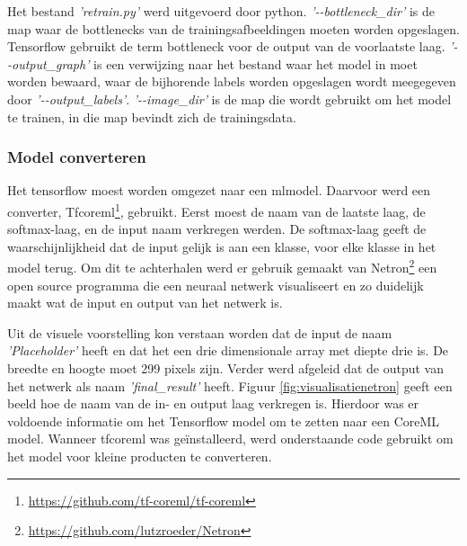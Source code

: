 
Het bestand \textit{'retrain.py'} werd uitgevoerd door python. \textit{'-\phantom{}-bottleneck\_dir'} is de map waar de bottlenecks van de trainingsafbeeldingen moeten worden opgeslagen. Tensorflow gebruikt de term bottleneck voor de output van de voorlaatste laag. \textit{'-\phantom{}-output\_graph'} is een verwijzing naar het bestand waar het model in moet worden bewaard, waar de bijhorende labels worden opgeslagen wordt meegegeven door  \textit{'-\phantom{}-output\_labels'}.  \textit{'-\phantom{}-image\_dir'} is de map die wordt gebruikt om het model te trainen, in die map bevindt zich de trainingsdata. 

\subsubsection{Model converteren}
\label{sssec:Model converteren}

Het tensorflow moest worden omgezet naar een mlmodel. Daarvoor werd een converter, Tfcoreml\footnote{\url{https://github.com/tf-coreml/tf-coreml}}, gebruikt. Eerst moest de naam van de laatste laag, de softmax-laag, en de input naam verkregen werden. De softmax-laag geeft de waarschijnlijkheid dat de input gelijk is aan een klasse, voor elke klasse in het model terug. Om dit te achterhalen werd er gebruik gemaakt van Netron\footnote{\url{https://github.com/lutzroeder/Netron}} een open source programma die een neuraal netwerk visualiseert en zo duidelijk maakt wat de input en output van het netwerk is. 

Uit de visuele voorstelling kon verstaan worden dat de input de naam \textit{'Placeholder'} heeft en dat het een drie dimensionale array met diepte drie is. De breedte en hoogte moet 299 pixels zijn. Verder werd afgeleid dat de output van het netwerk als naam \textit{'final\_result'} heeft. Figuur \ref{fig:visualisatienetron} geeft een beeld hoe de naam van de in- en output laag verkregen is. Hierdoor was er voldoende informatie om het Tensorflow model om te zetten naar een CoreML model. Wanneer tfcoreml was geïnstalleerd, werd onderstaande code gebruikt om het model voor kleine producten te converteren. 


